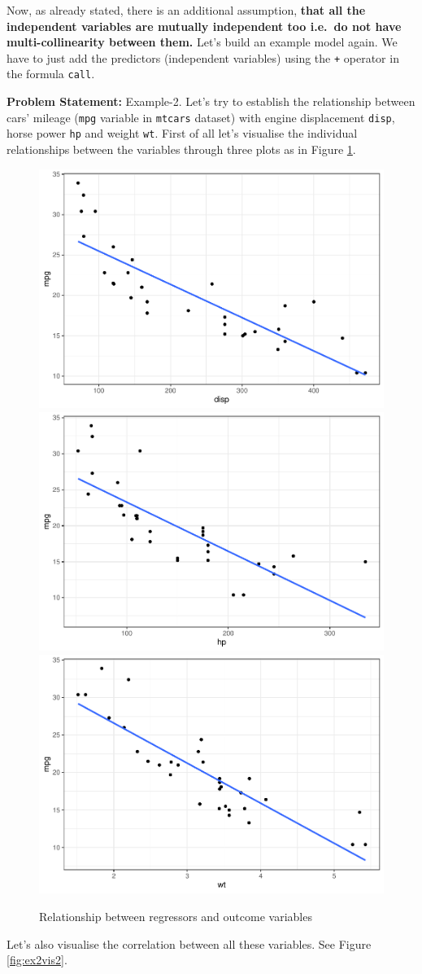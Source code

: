 \documentclass[
]{book}
\begin{document}
Now, as already stated, there is an additional assumption, \textbf{that all the independent variables are mutually independent too i.e.~do not have multi-collinearity between them.} Let's build an example model again. We have to just add the predictors (independent variables) using the \texttt{+} operator in the formula \texttt{call}.

\textbf{Problem Statement:} Example-2. Let's try to establish the relationship between cars' mileage (\texttt{mpg} variable in \texttt{mtcars} dataset) with engine displacement \texttt{disp}, horse power \texttt{hp} and weight \texttt{wt}. First of all let's visualise the individual relationships between the variables through three plots as in Figure \ref{fig:ex2vis}.

\begin{figure}

{\centering \includegraphics[width=0.31\linewidth]{DauR_files/figure-latex/ex2vis-1} \includegraphics[width=0.31\linewidth]{DauR_files/figure-latex/ex2vis-2} \includegraphics[width=0.31\linewidth]{DauR_files/figure-latex/ex2vis-3} 

}

\caption{Relationship between regressors and outcome variables}\label{fig:ex2vis}
\end{figure}

Let's also visualise the correlation between all these variables. See Figure \ref{fig:ex2vis2}.
\end{document}
